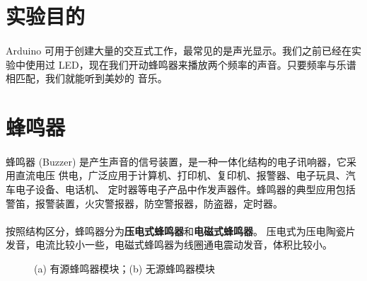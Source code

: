 \documentclass[UTF8, oneside]{ctexbook}
\begin{document}
\section{实验目的}
\paragraph{}
Arduino 可用于创建大量的交互式工作，最常见的是声光显示。我们之前已经在实验中使用过 
LED，现在我们开动蜂鸣器来播放两个频率的声音。只要频率与乐谱相匹配，我们就能听到美妙的
音乐。

\section{蜂鸣器}
\paragraph{}
蜂鸣器 (Buzzer) 是产生声音的信号装置，是一种一体化结构的电子讯响器，它采用直流电压
供电，广泛应用于计算机、打印机、复印机、报警器、电子玩具、汽车电子设备、电话机、
定时器等电子产品中作发声器件。蜂鸣器的典型应用包括警笛，报警装置，火灾警报器，防空警报器，防盗器，定时器。

\paragraph{}
按照结构区分，蜂鸣器分为\textbf{压电式蜂鸣器}和\textbf{电磁式蜂鸣器}。
压电式为压电陶瓷片发音，电流比较小一些，电磁式蜂鸣器为线圈通电震动发音，体积比较小。

\begin{figure}[h]
    \centering


    \centering
    \caption{(a) 有源蜂鸣器模块；(b) 无源蜂鸣器模块}
    \label{buzzer}
\end{figure}
\end{document}
